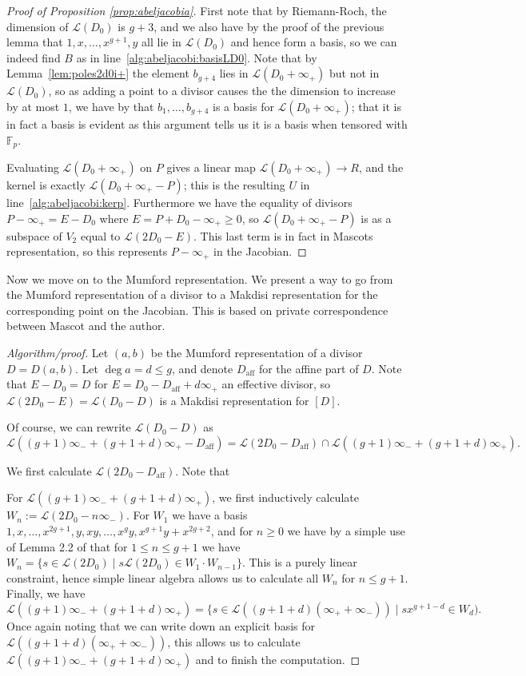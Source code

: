 \documentclass[12pt]{article}
\newcommand{\Lcal}{\mathcal{L}}
\newcommand{\F}{\mathbb{F}}
\theoremstyle{plain}
\theoremstyle{definition}
\theoremstyle{remark}
\begin{document}
\begin{proof}[Proof of Proposition \ref{prop:abeljacobia}]
First note that by Riemann-Roch, the dimension of $\Lcal(D_0)$ is $g + 3$, and we also have by the proof of the previous lemma that $1,x,\dots,x^{g+1},y$ all lie in $\Lcal(D_0)$ and hence form a basis, so we can indeed find $B$ as in line~\ref{alg:abeljacobi:basisLD0}. Note that by Lemma~\ref{lem:poles2d0i+} the element $b_{g+4}$ lies in $\Lcal(D_0 + \infty_+)$ but not in $\Lcal(D_0)$, so as adding a point to a divisor causes the the dimension to increase by at most $1$, we have by that $b_1,\dots,b_{g+4}$ is a basis for $\Lcal(D_0 + \infty_+)$; that it is in fact a basis is evident as this argument tells us it is a basis when tensored with $\F_p$.

Evaluating $\Lcal(D_0 + \infty_+)$ on $P$ gives a linear map $\Lcal(D_0 + \infty_+) \to R$, and the kernel is exactly $\Lcal(D_0 + \infty_+ - P)$; this is the resulting $U$ in line~\ref{alg:abeljacobi:kerp}. Furthermore we have the equality of divisors $P-\infty_+ = E - D_0$ where $E = P + D_0 - \infty_+ \geq 0$, so $\Lcal(D_0 + \infty_+ - P)$ is as a subspace of $V_2$ equal to $\Lcal(2D_0 - E)$. This last term is in fact in Mascots representation, so this represents $P-\infty_+$ in the Jacobian.
\end{proof}

Now we move on to the Mumford representation. We present a way to go from the Mumford representation of a divisor to a Makdisi representation for the corresponding point on the Jacobian. This is based on private correspondence between Mascot and the author.
\begin{proof}[Algorithm/proof]
Let $(a,b)$ be the Mumford representation of a divisor $D = D(a,b)$. Let $\deg a = d \leq g$, and denote $D_{\text{aff}}$ for the affine part of $D$. Note that $E-D_0 = D$ for $E = D_0 - D_{\text{aff}} + d\infty_+$ an effective divisor, so $\Lcal(2D_0 - E) = \Lcal(D_0 - D)$ is a Makdisi representation for $[D]$.

Of course, we can rewrite $\Lcal(D_0 -D)$ as 
\[
\Lcal((g+1)\infty_- + (g+1+d)\infty_+ - D_{\text{aff}}) = \Lcal(2D_0 - D_{\text{aff}} ) \cap \Lcal((g+1)\infty_- + (g+1+d)\infty_+).
\]

We first calculate $\Lcal(2D_0 - D_{\text{aff}})$. Note that 

For $\Lcal((g+1)\infty_- + (g+1+d)\infty_+)$, we first inductively calculate $W_n := \Lcal(2D_0 - n\infty_-)$. For $W_1$ we have a basis $1,x,\dots,x^{2g+1},y,xy,\dots,x^g y, x^{g+1}y+x^{2g+2}$, and for $n \geq 0$ we have by a simple use of Lemma 2.2 of \citep{makdisi04} that for $1 \leq n \leq g+1$ we have $W_{n} = \{s \in \Lcal(2D_0) \mid s\Lcal(2D_0) \in W_1 \cdot W_{n-1}\}$. This is a purely linear constraint, hence simple linear algebra allows us to calculate all $W_n$ for $n \leq g+1$. Finally, we have
\[
\Lcal((g+1)\infty_- + (g+1+d)\infty_+) = \{ s \in \Lcal((g+1+d)(\infty_+ + \infty_-)) \mid sx^{g+1-d} \in W_d).
\] 
Once again noting that we can write down an explicit basis for $\Lcal((g+1+d)(\infty_+ + \infty_-))$, this allows us to calculate $\Lcal((g+1)\infty_- + (g+1+d)\infty_+)$ and to finish the computation.
\end{proof}
\end{document}
